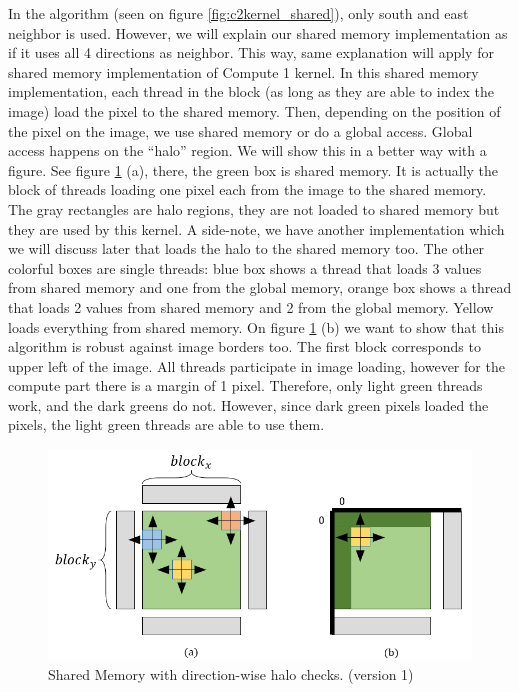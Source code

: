 \documentclass[12pt,reqno]{amsart}
\begin{document}
In the algorithm (seen on figure \ref{fig:c2kernel_shared}), only south and east neighbor is used. However, we will explain our shared memory implementation as if it uses all 4 directions as neighbor. This way, same explanation will apply for shared memory implementation of Compute 1 kernel. In this shared memory implementation, each thread in the block (as long as they are able to index the image) load the pixel to the shared memory. Then, depending on the position of the pixel on the image, we use shared memory or do a global access. Global access happens on the ``halo'' region. We will show this in a better way with a figure. See figure \ref{fig:shmem1} (a), there, the green box is shared memory. It is actually the block of threads loading one pixel each from the image to the shared memory. The gray rectangles are halo regions, they are not loaded to shared memory but they are used by this kernel. A side-note, we have another implementation which we will discuss later that loads the halo to the shared memory too. The other colorful boxes are single threads: blue box shows a thread that loads 3 values from shared memory and one from the global memory, orange box shows a thread that loads 2 values from shared memory and 2 from the global memory. Yellow loads everything from shared memory. On figure \ref{fig:shmem1} (b) we want to show that this algorithm is robust against image borders too. The first block corresponds to upper left of the image. All threads participate in image loading, however for the compute part there is a margin of 1 pixel. Therefore, only light green threads work, and the dark greens do not. However, since dark green pixels loaded the pixels, the light green threads are able to use them.

\begin{figure}[h]
\centering
\includegraphics[width=0.9\linewidth]{shmemaccessv1.png}
\caption{Shared Memory with direction-wise halo checks. (version 1)}
\label{fig:shmem1}
\end{figure}
\end{document}
